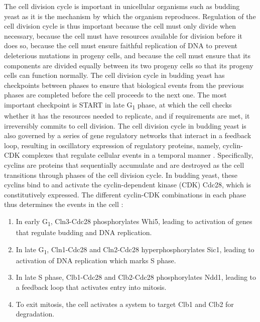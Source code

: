 The cell division cycle is important in unicellular organisms such as budding yeast as it is the mechanism by which the organism reproduces.
Regulation of the cell division cycle is thus important
because the cell must only divide when necessary,
because the cell must have resources available for division before it does so,
because the cell must ensure faithful replication of DNA to prevent deleterious mutations in progeny cells,
and because the cell must ensure that its components are divided equally between its two progeny cells so that its progeny cells can function normally.
The cell division cycle in budding yeast has checkpoints between phases to ensure that biological events from the previous phases are completed before the cell proceeds to the next one.
The most important checkpoint is START in late G\textsubscript{1} phase, at which the cell checks whether it has the resources needed to replicate, and if requirements are met, it irreversibly commits to cell division.
The cell division cycle in budding yeast is also governed by a series of gene regulatory networks that interact in a feedback loop, resulting in oscillatory expression of regulatory proteins, namely, cyclin-CDK complexes that regulate cellular events in a temporal manner \parencite{adlerYeastCellCycle2022, orlandoGlobalControlCellcycle2008, murrayRecyclingCellCycle2004}.
Specifically, cyclins are proteins that sequentially accumulate and are destroyed as the cell transitions through phases of the cell division cycle.
In budding yeast, these cyclins bind to and activate the cyclin-dependent kinase (CDK) Cdc28, which is constitutively expressed.
The different cyclin-CDK combinations in each phase thus determines the events in the cell \parencite{adlerYeastCellCycle2022}:

\begin{enumerate}
  \item In early G\textsubscript{1}, Cln3-Cdc28 phosphorylates Whi5, leading to activation of genes that regulate budding and DNA replication.
  \item In late G\textsubscript{1}, Cln1-Cdc28 and Cln2-Cdc28 hyperphosphorylates Sic1, leading to activation of DNA replication which marks S phase.
  \item In late S phase, Clb1-Cdc28 and Clb2-Cdc28 phosphorylates Ndd1, leading to a feedback loop that activates entry into mitosis.
  \item To exit mitosis, the cell activates a system to target Clb1 and Clb2 for degradation.
\end{enumerate}

